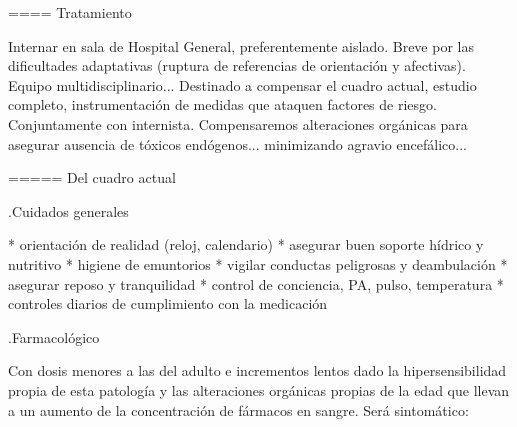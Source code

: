 \documentclass[encares.tex]{subfiles}
\begin{document}
==== Tratamiento

Internar en sala de Hospital General, preferentemente aislado. Breve por las dificultades adaptativas (ruptura de referencias de orientación y afectivas). Equipo multidisciplinario... Destinado a compensar el cuadro actual, estudio completo, instrumentación de medidas que ataquen factores de riesgo. Conjuntamente con internista. Compensaremos alteraciones orgánicas para asegurar ausencia de tóxicos endógenos... minimizando agravio encefálico...

===== Del cuadro actual

.Cuidados generales

* orientación de realidad (reloj, calendario)
* asegurar buen soporte hídrico y nutritivo
* higiene de emuntorios
* vigilar conductas peligrosas y deambulación
* asegurar reposo y tranquilidad
* control de conciencia, PA, pulso, temperatura
* controles diarios de cumplimiento con la medicación

.Farmacológico

Con dosis menores a las del adulto e incrementos lentos dado la hipersensibilidad propia de esta patología y las alteraciones orgánicas propias de la edad que llevan a un aumento de la concentración de fármacos en sangre. Será sintomático:
\end{document}

